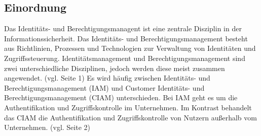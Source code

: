 \documentclass[11pt]{article}
\begin{document}
\subsection{Einordnung}
Das Identitäts- und Berechtigungsmanagent ist eine zentrale Disziplin in der Informationssicherheit. Das Identitäts- und Berechtigungsmanagement besteht aus Richtlinien, Prozessen und Technologien zur Verwaltung von Identitäten und Zugriffssteuerung. Identitätsmanagement und Berechtigungsmanagement sind zwei unterschiedliche Disziplinen, jedoch werden diese meist zusammen angewendet. (vgl. \cite{mohammed2017systematic} Seite 1) Es wird häufig zwischen Identitäts- und Berechtigungsmanagement (IAM) und Customer Identitäts- und Berechtigungsmanagement (CIAM) unterschieden. Bei IAM geht es um die Authentifikation und Zugriffskontrolle im Unternehmen. Im Kontrast behandelt das CIAM die Authentifikation und Zugriffskontrolle von Nutzern außerhalb vom Unternehmen. (vgl. \cite{liveretos2022customer} Seite 2)
\end{document}
